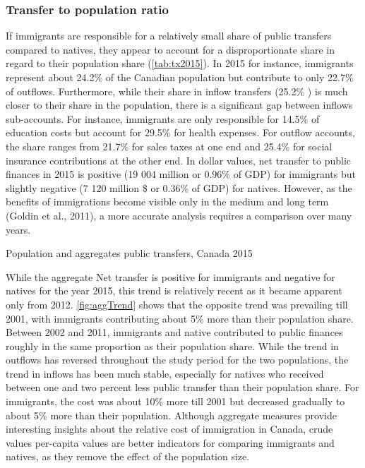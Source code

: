 \subsubsection*{Transfer to population ratio}
If immigrants are responsible for a relatively small share of public transfers compared to natives, they appear to account for a disproportionate share in regard to their population share (\autoref{tab:tx2015}).
In 2015 for instance, immigrants represent about 24.2\% of the Canadian population but contribute to only 22.7\% of outflows.
Furthermore, while their share in inflow transfers (25.2\% ) is much closer to their share in the population, there is a significant gap between inflows sub-accounts.
For instance, immigrants are only responsible for 14.5\% of education costs but account for 29.5\% for health expenses.
For outflow accounts, the share ranges from 21.7\% for sales taxes at one end and 25.4\% for social insurance contributions at the other end.
In dollar values, net transfer to public finances in 2015 is positive (19 004 million or 0.96\% of GDP) for immigrants but slightly negative (7 120 million \$ or 0.36\% of GDP) for natives.
However, as the benefits of immigrations become visible only in the medium and long term (Goldin et al., 2011), a more accurate analysis requires a comparison over many years.

  \begin{table}[H]%
    \caption{Population and aggregates public transfers, Canada 2015}
    \label{tab:tx2015}%
    \begin{center}
   \end{center}
\end{table}%

  While the aggregate Net transfer is positive for immigrants and negative for natives for the year 2015, this trend is relatively recent as it became apparent only from 2012.
\autoref{fig:aggTrend} shows that the opposite trend was prevailing till 2001, with immigrants contributing about 5\% more than their population share.
Between 2002 and 2011, immigrants and native contributed to public finances roughly in the same proportion as their population share.
While the trend in outflows has reversed throughout the study period for the two populations, the trend in inflows has been much stable, especially for natives who received between one and two percent less public transfer than their population share.
For immigrants, the cost was about 10\% more till 2001 but decreased gradually to about 5\% more than their population.
Although aggregate measures provide interesting insights about the relative cost of immigration in Canada, crude values per-capita values are better indicators for comparing immigrants and natives, as they remove the effect of the population size.

